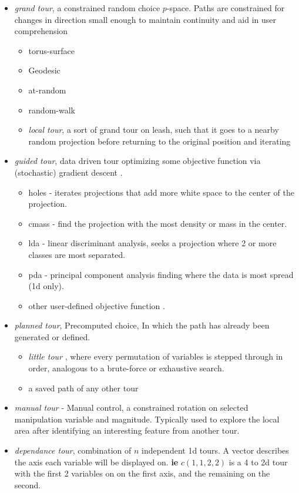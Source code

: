 \documentclass{monashthesis}
\begin{document}
\begin{itemize}
\item
  \emph{grand tour}, a constrained random choice \(p\)-space. Paths are
  constrained for changes in direction small enough to maintain
  continuity and aid in user comprehension

  \begin{itemize}
  \tightlist
  \item
    torus-surface \autocite{asimov_grand_1985}
  \item
    Geodesic
  \item
    at-random
  \item
    random-walk
  \item
    \emph{local tour}, a sort of grand tour on leash, such that it goes
    to a nearby random projection before returning to the original
    position and iterating
  \end{itemize}
\item
  \emph{guided tour}, data driven tour optimizing some objective
  function via (stochastic) gradient descent
  \autocite{hurley_analyzing_1990}.

  \begin{itemize}
  \tightlist
  \item
    holes \autocite{cook_projection_1993} - iterates projections that
    add more white space to the center of the projection.
  \item
    cmass \autocite{cook_projection_1993} - find the projection with the
    most density or mass in the center.
  \item
    lda \autocite{lee_projection_2005} - linear discriminant analysis,
    seeks a projection where 2 or more classes are most separated.
  \item
    pda - principal component analysis finding where the data is most
    spread (1d only).
  \item
    other user-defined objective function \autocite{wickham_tourr_2011}.
  \end{itemize}
\item
  \emph{planned tour}, Precomputed choice, In which the path has already
  been generated or defined.

  \begin{itemize}
  \tightlist
  \item
    \emph{little tour} \autocite{mcdonald_interactive_1982}, where every
    permutation of variables is stepped through in order, analogous to a
    brute-force or exhaustive search.
  \item
    a saved path of any other tour
  \end{itemize}
\item
  \emph{manual tour} - Manual control, a constrained rotation on
  selected manipulation variable and
  magnitude\autocite{cook_manual_1997}. Typically used to explore the
  local area after identifying an interesting feature from another tour.
\item
  \emph{dependance tour}, combination of \(n\) independent 1d tours. A
  vector describes the axis each variable will be displayed on.
  \textbf{ie} \(c(1, 1, 2, 2)\) is a 4 to 2d tour with the first 2
  variables on on the first axis, and the remaining on the second.


\end{itemize}
\end{document}
